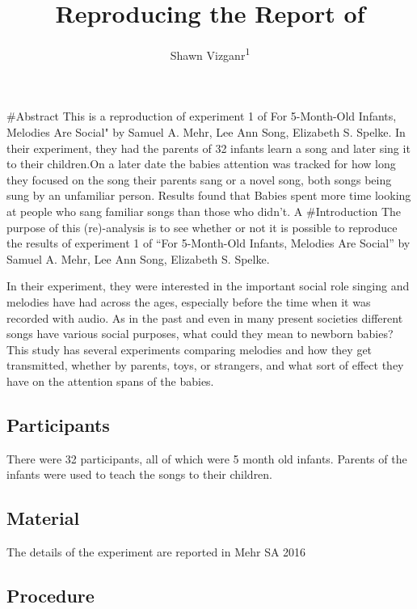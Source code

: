 \documentclass[
  english,
  man]{apa6}
\title{Reproducing the Report of}
\author{Shawn Vizganr\textsuperscript{1}}
\date{}
\affiliation{\vspace{0.5cm}\textsuperscript{1} Brooklyn College City University of New York}
\begin{document}
\maketitle

\#Abstract
This is a reproduction of experiment 1 of For 5-Month-Old Infants, Melodies Are Social" by Samuel A. Mehr, Lee Ann Song, Elizabeth S. Spelke. In their experiment, they had the parents of 32 infants learn a song and later sing it to their children.On a later date the babies attention was tracked for how long they focused on the song their parents sang or a novel song, both songs being sung by an unfamiliar person. Results found that Babies spent more time looking at people who sang familiar songs than those who didn't. A
\#Introduction
The purpose of this (re)-analysis is to see whether or not it is possible to reproduce the results of experiment 1 of \enquote{For 5-Month-Old Infants, Melodies Are Social} by Samuel A. Mehr, Lee Ann Song, Elizabeth S. Spelke.

In their experiment, they were interested in the important social role singing and melodies have had across the ages, especially before the time when it was recorded with audio. As in the past and even in many present societies different songs have various social purposes, what could they mean to newborn babies? This study has several experiments comparing melodies and how they get transmitted, whether by parents, toys, or strangers, and what sort of effect they have on the attention spans of the babies.

\hypertarget{participants}{%
\subsection{Participants}\label{participants}}

There were 32 participants, all of which were 5 month old infants. Parents of the infants were used to teach the songs to their children.

\hypertarget{material}{%
\subsection{Material}\label{material}}

The details of the experiment are reported in Mehr SA 2016

\hypertarget{procedure}{%
\subsection{Procedure}\label{procedure}}
\end{document}
